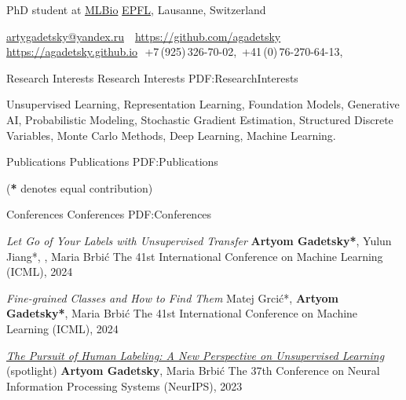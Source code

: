 \documentclass[letterpaper,MMMyyyy,nonstopmode]{simpleresumecv}
\newcommand{\CVAuthor}{Artyom Gadetsky}
\begin{document}

\Title{\CVAuthor}

\begin{SubTitle}
PhD student at \href{https://brbiclab.epfl.ch}{MLBio}
\href{https://www.epfl.ch/schools/ic/}{EPFL}, Lausanne, Switzerland
\par
\href{mailto:artygadetsky@yandex.ru}{artygadetsky@yandex.ru}
\,\SubBulletSymbol\,
\href{https://github.com/agadetsky}{https://github.com/agadetsky}
\,\SubBulletSymbol\,\href{https://agadetsky.github.io}{https://agadetsky.github.io}\,\SubBulletSymbol\,
+7\,(925)\,326-70-02,\ +41\,(0)\,76-270-64-13,
\end{SubTitle}

\begin{Body}



\Section
{Research Interests}
{Research Interests}
{PDF:ResearchInterests}

\Item Unsupervised Learning, Representation Learning, Foundation Models, Generative AI, Probabilistic Modeling, Stochastic Gradient Estimation, Structured Discrete Variables, Monte Carlo Methods, Deep Learning, Machine Learning.

\BigGap


\Section
{Publications}
{Publications}
{PDF:Publications}

\Entry
\hfill
(\textbf{*} denotes equal contribution)

\SubSection
{Conferences}
{Conferences}
{PDF:Conferences}

\Item
\textit{Let Go of Your Labels with Unsupervised Transfer}
\Item
\textbf{Artyom Gadetsky*}, Yulun Jiang*, , Maria Brbić
\Item
The 41st International Conference on Machine Learning (ICML), 2024
\Gap

\Item
\textit{Fine-grained Classes and How to Find Them}
\Item
Matej Grcić*, \textbf{Artyom Gadetsky*}, Maria Brbić
\Item
The 41st International Conference on Machine Learning (ICML), 2024
\Gap

\Item
\href{https://proceedings.neurips.cc/paper_files/paper/2023/hash/be38c74290c251820e396680a82ce12d-Abstract-Conference.html}{\textit{The Pursuit of Human Labeling: A New Perspective on Unsupervised Learning}} (spotlight)
\Item
\textbf{Artyom Gadetsky}, Maria Brbić
\Item
The 37th Conference on Neural Information Processing Systems (NeurIPS), 2023
\Gap


\end{Body}
\end{document}
